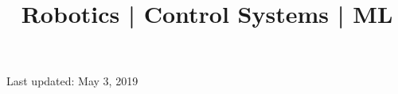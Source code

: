 \documentclass[10pt,a4paper]{moderncv}
\title{Robotics | Control Systems  | ML \newline
\bf{\lb{\footnotesize
Rerum Cognoscere Causas: To know the causes of things.} }}
\begin{document}
	\makecvtitle
	
	
	
	
	
	
	
	
	
	
	
	
%
	\footnotesize \centering Last updated: May 3, 2019
\renewcommand{\listitemsymbol}{-}
\clearpage
\end{document}
